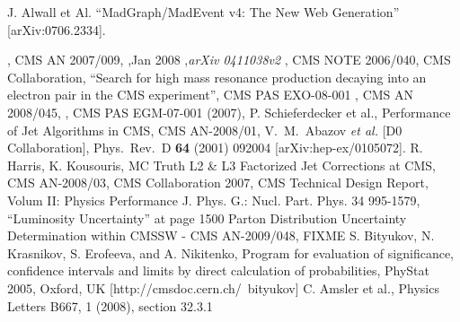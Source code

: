 \documentclass{cmspaper}
\begin{document}
\begin{linenumbers}
\begin{thebibliography}{}
  
  J. Alwall et Al.
  ``MadGraph/MadEvent v4: The New Web Generation''
  [arXiv:0706.2334].
  
  
, CMS AN 2007/009,
,Jan 2008 ,{\em arXiv 0411038v2}
, CMS NOTE 2006/040,
 {CMS Collaboration, ``Search for high mass resonance production decaying into an electron pair in the CMS experiment''}, CMS PAS EXO-08-001
, CMS AN 2008/045,
, CMS PAS EGM-07-001 (2007),
 {P. Schieferdecker et al., Performance of Jet Algorithms in CMS}, CMS AN-2008/01,
  V.~M.~Abazov {\it et al.}  [D0 Collaboration], 	 
  Phys.\ Rev.\  D {\bf 64} (2001) 092004 	 
  [arXiv:hep-ex/0105072]. 	 
 {R. Harris, K. Kousouris, MC Truth L2 \& L3 Factorized Jet Corrections at CMS}, CMS AN-2008/03,
 {CMS Collaboration 2007, CMS Technical Design Report, Volum II: Physics Performance} 
J. Phys. G.: Nucl. Part. Phys. 34 995-1579, ``Luminosity Uncertainty'' at page 1500
 {Parton Distribution Uncertainty Determination within CMSSW - CMS AN-2009/048}, FIXME
 S. Bityukov, N. Krasnikov, S. Erofeeva, and A. Nikitenko, Program for evaluation of significance,
  confidence intervals and limits by direct calculation of probabilities, PhyStat 2005, Oxford, UK 
  [http://cmsdoc.cern.ch/~bityukov]
  C. Amsler et al., Physics Letters B667, 1 (2008), section 32.3.1
  
\end{thebibliography}

\end{linenumbers}
\end{document}
